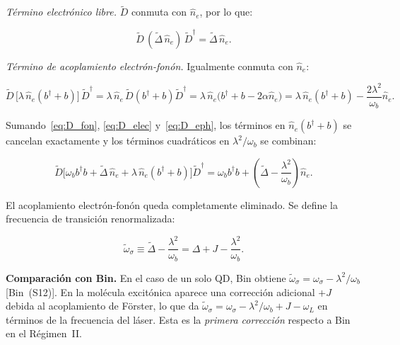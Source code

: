 \documentclass[12pt]{article}
\begin{document}
	\medskip
	\noindent
	\textit{T\'ermino electr\'onico libre.}
	$\widetilde{D}$ conmuta con $\hat{n}_e$, por lo que:
	
	\begin{equation}
		\widetilde{D}\,(\widetilde\Delta\,\hat{n}_e)\,\widetilde{D}^\dagger
		= \widetilde\Delta\,\hat{n}_e.
		\label{eq:D_elec}
	\end{equation}
	
	\medskip
	\noindent
	\textit{T\'ermino de acoplamiento electr\'on-fon\'on.}
	Igualmente conmuta con $\hat{n}_e$:
	
	\begin{equation}
		\widetilde{D}\,\bigl[\lambda\,\hat{n}_e(b^\dagger+b)\bigr]\,\widetilde{D}^\dagger
		= \lambda\,\hat{n}_e\,\widetilde{D}(b^\dagger+b)\widetilde{D}^\dagger
		= \lambda\,\hat{n}_e\bigl(b^\dagger + b - 2\alpha\hat{n}_e\bigr)
		= \lambda\,\hat{n}_e(b^\dagger+b) - \frac{2\lambda^2}{\omega_b}\hat{n}_e.
		\label{eq:D_eph}
	\end{equation}
	
	\medskip
	\noindent
	Sumando~\eqref{eq:D_fon}, \eqref{eq:D_elec} y~\eqref{eq:D_eph}, los
	t\'erminos en $\hat{n}_e(b^\dagger + b)$ se cancelan exactamente y los
	t\'erminos cuadr\'aticos en $\lambda^2/\omega_b$ se combinan:
	
	\begin{equation}
		\widetilde{D}\bigl[\omega_b b^\dagger b + \widetilde\Delta\,\hat{n}_e
		+ \lambda\,\hat{n}_e(b^\dagger+b)\bigr]\widetilde{D}^\dagger
		= \omega_b b^\dagger b
		+ \left(\widetilde\Delta - \frac{\lambda^2}{\omega_b}\right)\hat{n}_e.
		\label{eq:D_libre}
	\end{equation}
	
	\noindent
	El acoplamiento electr\'on-fon\'on queda completamente eliminado. Se
	define la frecuencia de transici\'on renormalizada:
	
	\begin{equation}
		\widetilde\omega_\sigma \equiv \widetilde\Delta - \frac{\lambda^2}{\omega_b}
		= \Delta + J - \frac{\lambda^2}{\omega_b}.
		\label{eq:omega_sigma_tilde}
	\end{equation}
	
	\noindent
	\textbf{Comparaci\'on con Bin.}
	En el caso de un solo QD, Bin obtiene
	$\tilde\omega_\sigma = \omega_\sigma - \lambda^2/\omega_b$
	[Bin~(S12)]. En la mol\'ecula excit\'onica aparece una correcci\'on
	adicional $+J$ debida al acoplamiento de F\"orster, lo que da
	$\widetilde\omega_\sigma = \omega_\sigma - \lambda^2/\omega_b + J - \omega_L$
	en t\'erminos de la frecuencia del l\'aser. Esta es la \emph{primera
		correcci\'on} respecto a Bin en el R\'egimen~II.
	
\end{document}

